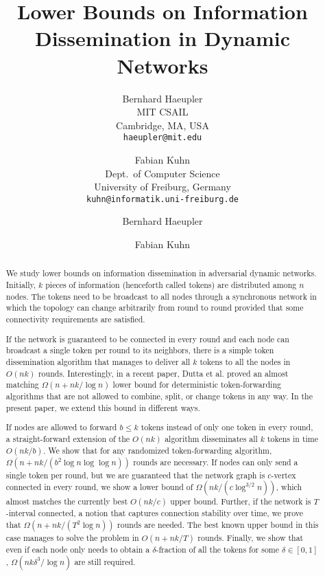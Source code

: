 \documentclass{llncs}
\author{Bernhard Haeupler\\MIT CSAIL\\Cambridge, MA, USA\\
\texttt{haeupler@mit.edu}\and Fabian Kuhn\\ Dept.\ of Computer Science\\
University of Freiburg, Germany
\\\texttt{kuhn@informatik.uni-freiburg.de}}
\date{}
\begin{document}
\title{Lower Bounds on Information Dissemination in Dynamic Networks}
\author{Bernhard Haeupler \and Fabian Kuhn}
\date{}

\maketitle

\begin{abstract}
    We study lower bounds on information dissemination in adversarial
    dynamic networks.
Initially, $k$ pieces of information (henceforth called tokens)
    are distributed among $n$ nodes. The tokens need to be broadcast
    to all nodes through a synchronous network in which the topology
    can change arbitrarily from round to round provided that some
    connectivity requirements are satisfied.

    If the network is guaranteed to be connected in every round and
    each node can broadcast a single token per round to its neighbors,
    there is a simple token dissemination algorithm that manages to
    deliver all $k$ tokens to all the nodes in $O(nk)$
    rounds. Interestingly, in a recent paper, Dutta et al. proved an
    almost matching $\Omega(n+nk/\log n)$ lower bound for
    deterministic token-forwarding algorithms that are not allowed to
    combine, split, or change tokens in any way. In the present paper,
    we extend this bound in different ways.

    If nodes are allowed to forward $b\leq k$ tokens instead of only
    one token in every round, a straight-forward extension of the
    $O(nk)$ algorithm disseminates all $k$ tokens in time
    $O(nk/b)$. We show that for any randomized token-forwarding
    algorithm, $\Omega(n + nk/(b^2\log n\log\log n))$ rounds are
    necessary. If nodes can only send a single token per round, but we
    are guaranteed that the network graph is $c$-vertex connected in
    every round, we show a lower bound of $\Omega(nk/(c\log^{3/2}n))$, which
    almost matches the currently best $O(nk/c)$ upper bound. Further,
    if the network is $T$-interval connected, a notion that captures
    connection stability over time, we prove that $\Omega(n +
    nk/(T^2\log n))$ rounds are needed. The best known upper bound in
    this case manages to solve the problem in $O(n + nk/T)$
    rounds. Finally, we show that even if each node only needs to
    obtain a $\delta$-fraction of all the tokens for some $\delta\in
    [0,1]$, $\Omega(nk\delta^3/\log n)$ are still required.
\end{abstract}
\end{document}

